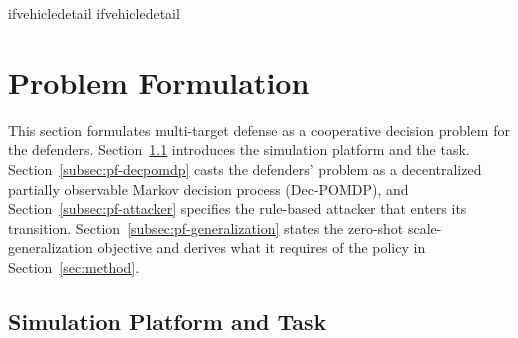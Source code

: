 \expandafter\ifx\csname ifvehicledetail\endcsname\relax
  \expandafter\newif\csname ifvehicledetail\endcsname
  \vehicledetailtrue
\fi

\section{Problem Formulation}
\label{sec:problem}

This section formulates multi-target defense as a cooperative decision problem for the defenders. Section~\ref{subsec:pf-scenario} introduces the simulation platform and the task. Section~\ref{subsec:pf-decpomdp} casts the defenders' problem as a decentralized partially observable Markov decision process (Dec-POMDP), and Section~\ref{subsec:pf-attacker} specifies the rule-based attacker that enters its transition. Section~\ref{subsec:pf-generalization} states the zero-shot scale-generalization objective and derives what it requires of the policy in Section~\ref{sec:method}.

\subsection{Simulation Platform and Task}
\label{subsec:pf-scenario}


